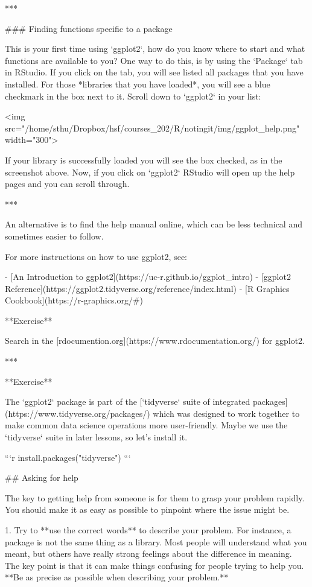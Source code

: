 {{***

### Finding functions specific to a package

This is your first time using `ggplot2`, how do you know where to start and what functions are available to you? One way to do this, is by using the `Package` tab in RStudio. If you click on the tab, you will see listed all packages that you have installed. For those *libraries that you have loaded*, you will see a blue checkmark in the box next to it. Scroll down to `ggplot2` in your list:

<img src="/home/sthu/Dropbox/hsf/courses_202/R/notingit/img/ggplot_help.png" width="300">  


If your library is successfully loaded you will see the box checked, as in the screenshot above. Now, if you click on `ggplot2` RStudio will open up the help pages and you can scroll through.

***

An alternative is to find the help manual online, which can be less technical and sometimes easier to follow. 

For more instructions on how to use ggplot2, see:

- [An Introduction to ggplot2](https://uc-r.github.io/ggplot_intro)
- [ggplot2 Reference](https://ggplot2.tidyverse.org/reference/index.html) 
- [R Graphics Cookbook](https://r-graphics.org/#)

**Exercise**

Search in the [rdocumention.org](https://www.rdocumentation.org/) for ggplot2.

***

**Exercise**

The `ggplot2` package is part of the [`tidyverse` suite of integrated packages](https://www.tidyverse.org/packages/) which was designed to work together to make common data science operations more user-friendly. 
Maybe we use the `tidyverse` suite in later lessons,  so let's install it. 

```r
install.packages("tidyverse")
```


## Asking for help

The key to getting help from someone is for them to grasp your problem rapidly. You
should make it as easy as possible to pinpoint where the issue might be.

1. Try to **use the correct words** to describe your problem. For instance, a package
is not the same thing as a library. Most people will understand what you meant,
but others have really strong feelings about the difference in meaning. The key
point is that it can make things confusing for people trying to help you. **Be as
precise as possible when describing your problem.**

}}
